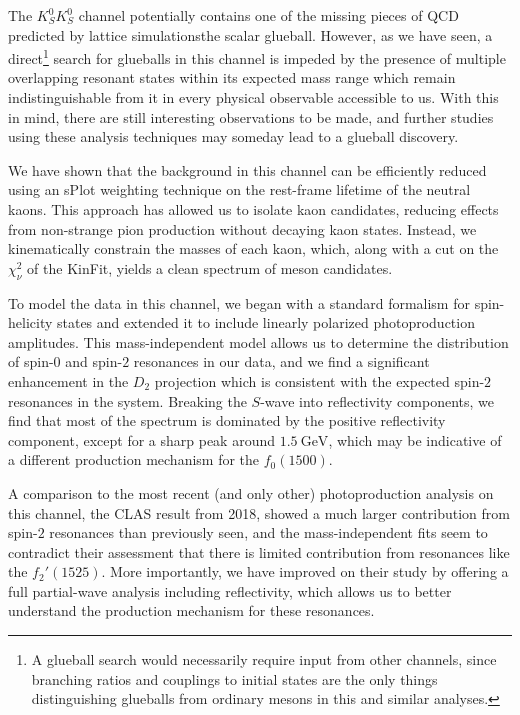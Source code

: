 The $K_S^0K_S^0$ channel potentially contains one of the missing pieces of QCD predicted by lattice simulations\textemdash the scalar glueball. However, as we have seen, a direct\footnote{A glueball search would necessarily require input from other channels, since branching ratios and couplings to initial states are the only things distinguishing glueballs from ordinary mesons in this and similar analyses.} search for glueballs in this channel is impeded by the presence of multiple overlapping resonant states within its expected mass range which remain indistinguishable from it in every physical observable accessible to us. With this in mind, there are still interesting observations to be made, and further studies using these analysis techniques may someday lead to a glueball discovery.

We have shown that the background in this channel can be efficiently reduced using an sPlot weighting technique on the rest-frame lifetime of the neutral kaons. This approach has allowed us to isolate kaon candidates, reducing effects from non-strange pion production without decaying kaon states. Instead, we kinematically constrain the masses of each kaon, which, along with a cut on the $\chi^2_\nu$ of the KinFit, yields a clean spectrum of meson candidates.

To model the data in this channel, we began with a standard formalism for spin-helicity states and extended it to include linearly polarized photoproduction amplitudes. This mass-independent model allows us to determine the distribution of spin-$0$ and spin-$2$ resonances in our data, and we find a significant enhancement in the $D_2$ projection which is consistent with the expected spin-$2$ resonances in the system. Breaking the $S$-wave into reflectivity components, we find that most of the spectrum is dominated by the positive reflectivity component, except for a sharp peak around $\SI{1.5}{\giga\electronvolt}$, which may be indicative of a different production mechanism for the $f_0(1500)$.

A comparison to the most recent (and only other) photoproduction analysis on this channel, the CLAS result from 2018, showed a much larger contribution from spin-$2$ resonances than previously seen, and the mass-independent fits seem to contradict their assessment that there is limited contribution from resonances like the $f_2'(1525)$. More importantly, we have improved on their study by offering a full partial-wave analysis including reflectivity, which allows us to better understand the production mechanism for these resonances.

